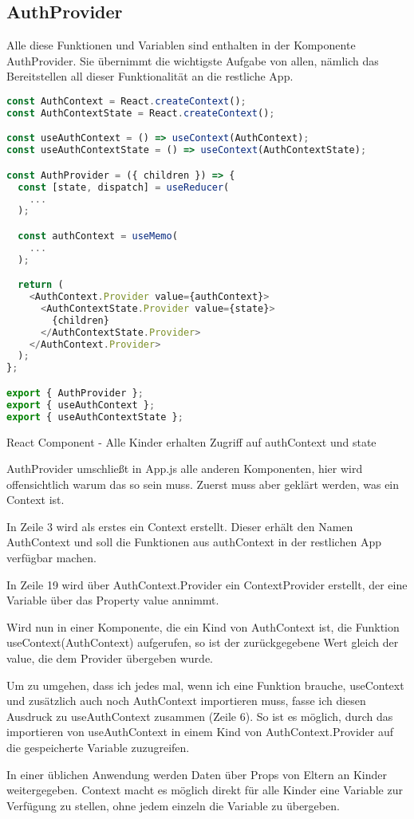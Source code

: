 \subsection{AuthProvider}
Alle diese Funktionen und Variablen sind enthalten in der Komponente AuthProvider. Sie übernimmt die
wichtigste Aufgabe von allen, nämlich das Bereitstellen all dieser Funktionalität an die restliche
App.

\begin{code}[htp]
\begin{lstlisting}[firstnumber=1,language=JavaScript, style=JSX]
const AuthContext = React.createContext();
const AuthContextState = React.createContext();

const useAuthContext = () => useContext(AuthContext);
const useAuthContextState = () => useContext(AuthContextState);

const AuthProvider = ({ children }) => {
  const [state, dispatch] = useReducer(
    ...
  );

  const authContext = useMemo(
    ...
  );

  return (
    <AuthContext.Provider value={authContext}>
      <AuthContextState.Provider value={state}>
        {children}
      </AuthContextState.Provider>
    </AuthContext.Provider>
  );
};

export { AuthProvider };
export { useAuthContext };
export { useAuthContextState };
\end{lstlisting}
\caption{React Component - Alle Kinder erhalten Zugriff auf authContext und state}
\end{code}

AuthProvider umschließt in App.js alle anderen Komponenten, hier wird offensichtlich warum das so
sein muss. Zuerst muss aber geklärt werden, was ein Context ist.

In Zeile 3 wird als erstes ein Context erstellt. Dieser erhält den Namen AuthContext und soll die
Funktionen aus authContext in der restlichen App verfügbar machen.

In Zeile 19 wird über AuthContext.Provider ein ContextProvider erstellt, der eine Variable über das
Property value annimmt.

Wird nun in einer Komponente, die ein Kind von AuthContext ist, die Funktion useContext(AuthContext)
aufgerufen, so ist der zurückgegebene Wert gleich der value, die dem Provider übergeben wurde.

Um zu umgehen, dass ich jedes mal, wenn ich eine Funktion brauche, useContext und zusätzlich auch
noch AuthContext importieren muss, fasse ich diesen Ausdruck zu useAuthContext zusammen (Zeile 6).
So ist es möglich, durch das importieren von useAuthContext in einem Kind von AuthContext.Provider
auf die gespeicherte Variable zuzugreifen.

In einer üblichen Anwendung werden Daten über Props von Eltern an Kinder weitergegeben. Context
macht es möglich direkt für alle Kinder eine Variable zur Verfügung zu stellen, ohne jedem einzeln
die Variable zu übergeben.